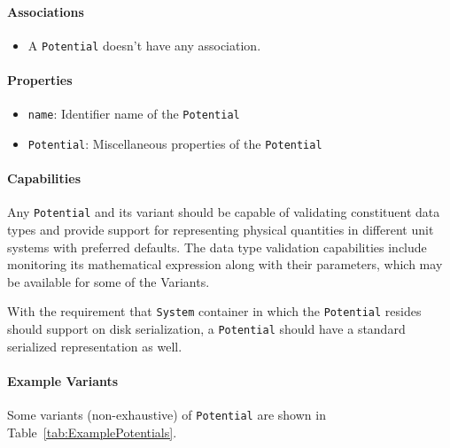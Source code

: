 \documentclass[12pt]{article}
\begin{document}
\paragraph{Associations}
\begin{itemize}
    \item A \texttt{Potential} doesn't have any association.
\end{itemize}
\paragraph{Properties}
\begin{itemize}
    \item \texttt{name}: Identifier name of the \texttt{Potential}
    \item \texttt{Potential}: Miscellaneous properties of the \texttt{Potential}
\end{itemize}
\paragraph{Capabilities}
Any \texttt{Potential} and its variant should be capable of validating constituent data types and provide support for representing physical quantities in different unit systems with preferred defaults. The data type validation capabilities include monitoring its mathematical expression along with their parameters, which may be available for some of the Variants.

With the requirement that \texttt{System} container in which the \texttt{Potential} resides should support on disk serialization, a \texttt{Potential} should have a standard serialized representation as well.

\paragraph{Example Variants}  Some variants (non-exhaustive) of \texttt{Potential} are shown in Table~\ref{tab:ExamplePotentials}.
\end{document}
